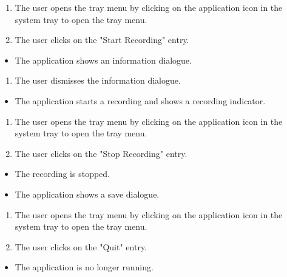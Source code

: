 \begin{tests}
    {\begin{enumerate}
        \item The \gls{user} opens the tray menu by clicking on the application icon in the system tray to open the tray menu.
        \item The \gls{user} clicks on the "Start Recording" entry.
    \end{enumerate}}
    {\begin{itemize}
        \item The application shows an information dialogue.
    \end{itemize}}
    
    {\begin{enumerate}
        \item The user dismisses the information dialogue.
    \end{enumerate}}
    {\begin{itemize}
        \item The application starts a recording and shows a recording indicator.
    \end{itemize}}
    
    {\begin{enumerate}
        \item The \gls{user} opens the tray menu by clicking on the application icon in the system tray to open the tray menu.
        \item The \gls{user} clicks on the "Stop Recording" entry.
    \end{enumerate}}
    {\begin{itemize}
        \item The recording is stopped.
        \item The application shows a save dialogue.
    \end{itemize}}

    {\begin{enumerate}
        \item The \gls{user} opens the tray menu by clicking on the application icon in the system tray to open the tray menu.
        \item The \gls{user} clicks on the "Quit" entry.
    \end{enumerate}}
    {\begin{itemize}
        \item The application is no longer running.
    \end{itemize}}


\end{tests}
